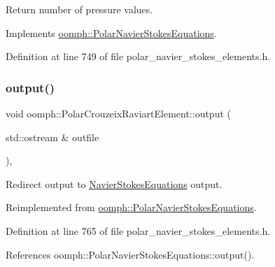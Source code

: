 Return number of pressure values. 



Implements \hyperlink{classoomph_1_1PolarNavierStokesEquations_af66cafead00372b56b677ab40a184d1f}{oomph\+::\+Polar\+Navier\+Stokes\+Equations}.



Definition at line 749 of file polar\+\_\+navier\+\_\+stokes\+\_\+elements.\+h.

\mbox{\label{classoomph_1_1PolarCrouzeixRaviartElement_ad93900ce702a77bb8d7710cf0f22ea8d}} 
\subsubsection{\texorpdfstring{output()}{output()}\hspace{0.1cm}{\footnotesize\ttfamily [1/4]}}
{\footnotesize\ttfamily void oomph\+::\+Polar\+Crouzeix\+Raviart\+Element\+::output (\begin{DoxyParamCaption}\item[{std\+::ostream \&}]{outfile }\end{DoxyParamCaption})\hspace{0.3cm}{\ttfamily [inline]}, {\ttfamily [virtual]}}



Redirect output to \hyperlink{classoomph_1_1NavierStokesEquations}{Navier\+Stokes\+Equations} output. 



Reimplemented from \hyperlink{classoomph_1_1PolarNavierStokesEquations_a720f9b13abd3bf876793f1f9e8538f61}{oomph\+::\+Polar\+Navier\+Stokes\+Equations}.



Definition at line 765 of file polar\+\_\+navier\+\_\+stokes\+\_\+elements.\+h.



References oomph\+::\+Polar\+Navier\+Stokes\+Equations\+::output().

\mbox{\label{classoomph_1_1PolarCrouzeixRaviartElement_ac170ddb5c2a7047d46a20d8c41da22df}} 
